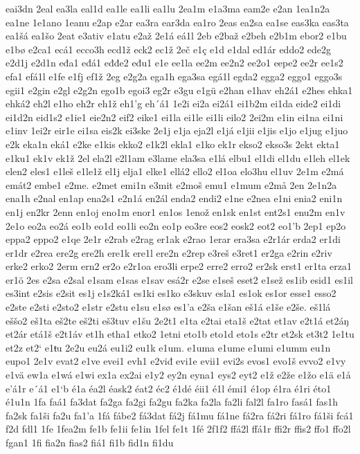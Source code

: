 eai3dn
2eal
ea3la
eal1d
ea1le
ea1li
ea1lu
2ea1m
e1a3ma
eam2e
e2an
1ea1n2a
ea1ne
1e1ano
1eanu
e2ap
e2ar
ea3ra
ear3da
ea1ro
2eas
ea2sa
ea1se
eas3ka
eas3ta
ea1šá
ea1šo
2eat
e3ativ
e1atu
e2až
2e1á
eá1l
2eb
e2baž
e2beh
e2b1m
ebor2
e1bu
e1bø
e2ca1
ecá1
ecco3h
ecd1ž
eck2
ec1ž
2eč
e1ç
e1d
e1dal
ed1ár
eddo2
ede2g
e2d1j
e2d1n
eđa1
eđá1
eđđe2
eđu1
e1e
ee1la
ee2m
ee2n2
ee2o1
eepe2
ee2r
ee1s2
efa1
efá1l
e1fe
e1fj
ef1ž
2eg
e2g2a
ega1h
ega3sa
egá1l
egda2
egga2
eggo1
eggo3s
egii1
e2gin
e2gl
e2g2n
ego1b
egoi3
eg2r
e3gu
e1gü
e2han
e1hav
eh2á1
e2hes
ehka1
ehká2
eh2l
e1ho
eh2r
eh1ž
eh1'g
eh´á1
1e2i
ei2a
ei2á1
ei1b2m
ei1da
eide2
ei1di
ei1d2n
eid1s2
e1ie1
eie2n2
eif2
eike1
ei1la
ei1le
ei1li
eilo2
2ei2m
e1in
ei1na
ei1ni
e1inv
1ei2r
eir1e
ei1sa
eis2k
ei3ske
2e1j
e1ja
eja2l
e1já
e1jii
e1jis
e1jo
e1jug
e1juo
e2k
eka1n
eká1
e2ke
e1kis
ekko2
e1k2l
ekla1
e1ko
ek1r
ekso2
ekso3s
2ekt
ekta1
e1ku1
ek1v
ek1ž
2el
ela2l
e2l1am
e3lame
ela3sa
e1lá
elbu1
el1di
el1du
e1leh
el1ek
elen2
eles1
e1leš
e1le1ž
el1j
elja1
elke1
ellá2
ello2
el1oa
elo3hu
el1uv
2e1m
e2má
emát2
embe1
e2me.
e2met
emi1n
e3mit
e2moš
emu1
e1mum
e2må
2en
2e1n2a
ena1h
e2nal
en1ap
ena2s1
e2n1á
en2ál
enda2
endi2
e1ne
e2nea
e1ni
enia2
eni1n
en1j
en2kr
2enn
en1oj
eno1m
enor1
en1os
1enož
en1sk
en1st
ent2s1
enu2m
en1v
2e1o
eo2a
eo2á
eo1b
eo1d
eo1li
eo2n
eo1p
eo3re
eos2
eosk2
eot2
eo1'b
2ep1
ep2o
eppa2
eppo2
e1qe
2e1r
e2rab
e2rag
er1ak
e2rao
1erar
era3sa
e2r1ár
erda2
er1di
er1dr
e2rea
ere2g
ere2h
ere1k
ere1l
ere2n
e2rep
e3reš
e3ret1
er2ga
e2rin
e2riv
erke2
erko2
2erm
ern2
er2o
e2r1oa
ero3li
erpe2
erre2
erro2
er2sk
erst1
er1ta
erza1
er1ö
2es
e2sa
e2sal
e1sam
e1sas
e1sav
esá2r
e2se
e1seš
eset2
e1sež
es1ib
esid1
es1il
es3int
e2sis
e2sit
es1j
e1s2ká1
es1ki
es1ko
e3skuv
esla1
es1ok
es1or
esse1
esso2
e2ste
e2sti
e2sto2
e1str
e2stu
e1su
e1sø
es1'a
e2ša
e1šan
eš1á
e1še
e2še.
eš1lá
eššo2
eš1ta
eš2te
eš2ti
eš3tuv
e1šu
2e2t1
e1ta
e2tai
eta1š
e2tat
et1av
e2t1á
et2áŋ
et2ár
etá1š
e2t1áv
et1h
etha1
etko2
1etni
eto1b
eto1d
eto1s
e2tr
et2sk
et3t2
1e1tu
et2z
et2`
e1ŧu
2e2u
eu2á
eu1i2
eu1k
e1um.
e1uma
e1ume
e1umi
e1umm
eu1n
eupo1
2e1v
evat2
e1ve
evei1
evh1
e2viđ
evi1e
evii1
evi2s
evos1
evo1š
evvo2
e1vy
e1vä
ew1a
e1wá
e1wi
ex1a
ex2ai
e1y2
ey2n
eyna1
eys2
eyt2
e1ž
e2že
e1žo
e1ä
e1å
e'á1r
e´á1
e1`b
é1a
éa2l
éask2
éat2
éc2
é1dé
éii1
é1l
émi1
é1op
é1ra
é1ri
éto1
é1u1n
1fa
faá1
fa3dat
fa2ga
fa2gi
fa2gu
fa2ka
fa2la
fa2li
fal2l
fa1ro
fasá1
fas1h
fa2sk
fa1ši
fa2u
fa1'a
1fá
fábe2
fá3dat
fá2j
fá1mu
fá1ne
fá2ra
fá2ri
fá1ro
fá1ši
fcá1
f2d
fdl1
1fe
1fea2m
fe1b
fe1ii
fe1in
1fel
fe1t
1fé
2f1f2
ffá2l
ffá1r
ffi2r
ffis2
ffo1
ffo2l
fgan1
1fi
fia2n
fias2
fiá1
fi1b
fid1n
fi1du

